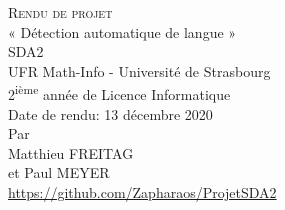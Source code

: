 \documentclass[
	paper=A4,
	twoside=false,
	parskip=full,
	chapterprefix=true,  
	appendixprefix=true,
	12pt,
	headings=normal,
	bibliography=totoc,
	titlepage=on,
	draft=false,
]{scrreprt}
\newcommand{\Autor}{}
\newcommand{\Was}{Rendu de projet}
\newcommand{\Titel}{Rendu de projet}
\newcommand{\AbgabeDatum}{13 décembre 2020}
\begin{document}

\begin{titlepage}
    \begin{center}
        \vspace*{2.5cm}
        {\Huge\scshape \Was}\\[1.5cm]
        {\large « Détection automatique de langue »}\\[1cm]
        {\large SDA2 }\\[1cm]
        {\large UFR Math-Info - Université de Strasbourg}\\[0.5cm]
        {\large 2\textsuperscript{ième} année de Licence Informatique}\\[1cm]
        {\large Date de rendu: \AbgabeDatum}\\[2cm]
        {\large Par}\\[0.5cm]
        {\large Matthieu FREITAG}\\[0.15cm]
        {\large et Paul MEYER}\\[4cm]
        {\large \href{https://github.com/Zapharaos/ProjetSDA2}{https://github.com/Zapharaos/ProjetSDA2}}
        \vfill
    \end{center}
\end{titlepage}
\clearpage

\pagestyle{plain}

\setcounter{tocdepth}{1}



\renewcommand\contentsname{\usekomafont{chapter}\mdseries Index} %
\tableofcontents

\printnoidxglossary[type=\acronymtype,title=Abréviations,toctitle=Abréviations] %
\clearpage 
 
\printnoidxglossary[nonumberlist] %
\clearpage
\end{document}
